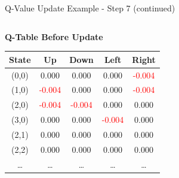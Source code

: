 \documentclass[aspectratio=169]{beamer}
\begin{document}
\begin{frame}{Q-Value Update Example - Step 7 (continued)}

    \begin{columns}
        \begin{column}{0.5\textwidth}
            \textbf{Q-Table Before Update}
            \small
            \begin{table}[h]
                \centering
                \begin{tabular}{|c|c|c|c|c|}
                    \hline
                    \textbf{State} & \textbf{Up} & \textbf{Down} & \textbf{Left} & \textbf{Right} \\
                    \hline
                    (0,0) & 0.000 & 0.000 & 0.000 & \textcolor{red}{-0.004} \\
                    (1,0) & \textcolor{red}{-0.004} & 0.000 & 0.000 & \textcolor{red}{-0.004} \\
                    (2,0) & \textcolor{red}{-0.004} & \textcolor{red}{-0.004} & 0.000 & 0.000 \\
                    (3,0) & 0.000 & 0.000 & \textcolor{red}{-0.004} & 0.000 \\
                    (2,1) & 0.000 & 0.000 & 0.000 & 0.000 \\
                    (2,2) & 0.000 & 0.000 & 0.000 & 0.000 \\
                    \dots & \dots & \dots & \dots & \dots \\
                    \hline
                \end{tabular}
            \end{table}
            
           
        \end{column}
        
        \begin{column}{0.5\textwidth}
            

\end{column}
\end{columns}
\end{frame}
\end{document}
